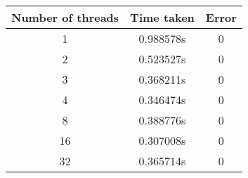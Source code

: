 \documentclass[12pt,letterpaper]{article}
\begin{document}
\begin{tabular}{ |c|c|c| } 
 \hline
 Number of threads & Time taken & Error \\
 \hline\hline
  1&0.988578s&0 \\
 \hline
 2&0.523527s&0\\
 \hline 
 3&0.368211s&0\\
 \hline
  4&0.346474s&0\\
 \hline
  8&0.388776s&0\\
 \hline
  16&0.307008s&0\\
 \hline
  32&0.365714s&0\\
 \hline
\end{tabular} \\\\\\
\end{document}

